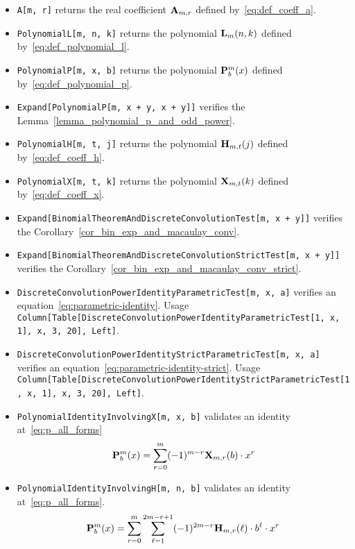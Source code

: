 \begin{itemize}
    \item \texttt{A[m, r]} returns the real coefficient ${\mathbf{A}} \sb{m,r}$ defined by~\eqref{eq:def_coeff_a}.
    \item \texttt{PolynomialL[m, n, k]} returns the polynomial ${\mathbf{L}}\sb{m}(n,k)$ defined by~\eqref{eq:def_polynomial_l}.
    \item \texttt{PolynomialP[m, x, b]} returns the polynomial ${\mathbf{P}}\sp{m} \sb{b}(x)$ defined by~\eqref{eq:def_polynomial_p}.
    \item \texttt{Expand[PolynomialP[m, x + y, x + y]]} verifies the Lemma~\ref{lemma_polynomial_p_and_odd_power}.
    \item \texttt{PolynomialH[m, t, j]} returns the polynomial ${\mathbf{H}} \sb{m,t} (j)$ defined by~\eqref{eq:def_coeff_h}.
    \item \texttt{PolynomialX[m, t, k]} returns the polynomial ${\mathbf{X}}\sb{m,t} (k)$ defined by~\eqref{eq:def_coeff_x}.
    \item \texttt{Expand[BinomialTheoremAndDiscreteConvolutionTest[m, x + y]]} verifies the Corollary~\ref{cor_bin_exp_and_macaulay_conv}.
    \item \texttt{Expand[BinomialTheoremAndDiscreteConvolutionStrictTest[m, x + y]]} verifies the Corollary~\ref{cor_bin_exp_and_macaulay_conv_strict}.
    \item \texttt{DiscreteConvolutionPowerIdentityParametricTest[m, x, a]} verifies an equation~\eqref{eq:parametric-identity}.
    Usage \texttt{Column[Table[DiscreteConvolutionPowerIdentityParametricTest[1, x, 1], {x, 3, 20}], Left]}.
    \item \texttt{DiscreteConvolutionPowerIdentityStrictParametricTest[m, x, a]} verifies an equation~\eqref{eq:parametric-identity-strict}.
    Usage \texttt{Column[Table[DiscreteConvolutionPowerIdentityStrictParametricTest[1, x, 1], {x, 3, 20}], Left]}.
    \item \texttt{PolynomialIdentityInvolvingX[m, x, b]} validates an identity at~\eqref{eq:p_all_forms}
    $${\mathbf{P}}\sp{m} \sb{b}(x) = \sum_{r=0}^{m} (-1)^{m-r} {\mathbf{X}}\sb{m,r} (b) \cdot x^r$$
    \item \texttt{PolynomialIdentityInvolvingH[m, n, b]} validates an identity at~\eqref{eq:p_all_forms}.
    $${\mathbf{P}}\sp{m} \sb{b}(x) =\sum_{r=0}^{m} \sum_{\ell=1}^{2m-r+1} (-1)^{2m-r} {\mathbf{H}} \sb{m,r} (\ell) \cdot b^\ell \cdot x^r$$
\end{itemize}

